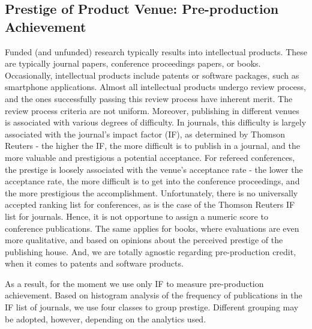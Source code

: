 \subsection {Prestige of Product Venue: Pre-production Achievement}
Funded (and unfunded) research typically results into intellectual products. These are typically journal papers, conference proceedings papers, or books. Occasionally, intellectual products include patents or software packages, such as smartphone applications. Almost all intellectual products undergo review process, and the ones successfully passing this review process have inherent merit.  The review process criteria are not uniform. Moreover, publishing in different venues is associated with various degrees of difficulty. In journals, this difficulty is largely associated with the journal's impact factor (IF), as determined by Thomson Reuters - the higher the IF, the more difficult is to publish in a journal, and the more valuable and prestigious a potential acceptance. For refereed conferences, the prestige is loosely associated with the venue's acceptance rate - the lower the acceptance rate, the more difficult is to get into the conference proceedings, and the more prestigious the accomplishment. Unfortunately, there is no universally accepted ranking list for conferences, as is the case of the Thomson Reuters IF list for journals. Hence, it is not opportune to assign a numeric score to conference publications. The same applies for books, where evaluations are even more qualitative, and based on opinions about the perceived prestige of the publishing house. And, we are totally agnostic regarding pre-production credit, when it comes to patents and software products.

As a result, for the moment we use only IF to measure pre-production achievement. Based on histogram analysis of the frequency of publications in the IF list of journals, we use four classes to group prestige. Different grouping may be adopted, however, depending on the analytics used.


